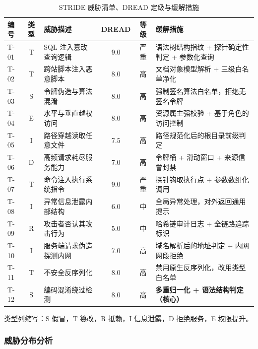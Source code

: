 \begin{table}[htbp]
\centering
\caption{STRIDE 威胁清单、DREAD 定级与缓解措施}
\label{tab:threat-model}
\scriptsize
\begin{threeparttable}
\begin{tabular}{@{}l c p{3.2cm} c c p{4.2cm}@{}}
\toprule
\textbf{编号} & \textbf{类型} & \textbf{威胁描述} & \textbf{DREAD} &
\textbf{等级} & \textbf{缓解措施} \\
\midrule
T-01 & T & SQL 注入篡改查询逻辑 & 9.0 & 严重 &
  语法树结构指纹 + 探针确定性判定 + 参数化查询 \\
T-02 & T & 跨站脚本注入恶意脚本 & 8.0 & 高 &
  文档对象模型解析 + 三级白名单净化 \\
T-03 & S & 令牌伪造与算法混淆 & 8.0 & 高 &
  强制签名算法白名单，拒绝无签名令牌 \\
T-04 & E & 水平与垂直越权访问 & 8.0 & 高 &
  资源属主强校验 + 基于角色的访问控制 \\
T-05 & I & 路径穿越读取任意文件 & 7.5 & 高 &
  路径规范化后的根目录前缀判定 \\
T-06 & D & 高频请求耗尽服务能力 & 7.0 & 高 &
  令牌桶 + 滑动窗口 + 来源信誉封禁 \\
T-07 & T & 命令注入执行系统指令 & 9.0 & 严重 &
  探针钩取执行点 + 参数数组化调用 \\
T-08 & I & 异常信息泄露内部结构 & 6.0 & 中 &
  全局异常处理，对外返回通用提示 \\
T-09 & R & 攻击者否认其攻击行为 & 5.0 & 中 &
  哈希链审计日志 + 全链路追踪标识 \\
T-10 & I & 服务端请求伪造探测内网 & 7.0 & 高 &
  域名解析后的地址判定 + 内网网段拒绝 \\
T-11 & T & 不安全反序列化 & 8.0 & 高 &
  禁用原生反序列化，改用类型白名单 \\
T-12 & S & 编码混淆绕过检测 & 8.0 & 高 &
  \textbf{多重归一化 + 语法结构判定（核心）} \\
\bottomrule
\end{tabular}
\begin{tablenotes}[flushleft]\footnotesize
\item 类型列缩写：S 假冒，T 篡改，R 抵赖，I 信息泄露，D 拒绝服务，E 权限提升。
\end{tablenotes}
\end{threeparttable}
\end{table}

\subsubsection{威胁分布分析}

